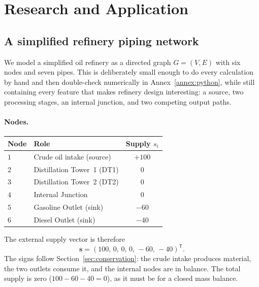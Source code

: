 \documentclass[11pt,a4paper]{article}
\newcommand{\vect}[1]{\mathbf{#1}}
\newcommand{\transpose}{^{\mathsf{T}}}
\begin{document}
\section{Research and Application}
\label{sec:application}

\subsection{A simplified refinery piping network}
\label{sec:refinery-model}

We model a simplified oil refinery as a directed graph $G = (V, E)$
with six nodes and seven pipes. This is deliberately small enough to
do every calculation by hand and then double-check numerically in
Annex~\ref{annex:python}, while still containing every feature that
makes refinery design interesting: a source, two processing stages, an
internal junction, and two competing output paths.

\paragraph{Nodes.}
\begin{center}
\begin{tabular}{@{}llc@{}}
\toprule
Node & Role & Supply $s_i$ \\
\midrule
$1$ & Crude oil intake (source)   & $+100$ \\
$2$ & Distillation Tower~1 (DT1)  & $0$    \\
$3$ & Distillation Tower~2 (DT2)  & $0$    \\
$4$ & Internal Junction           & $0$    \\
$5$ & Gasoline Outlet (sink)      & $-60$  \\
$6$ & Diesel Outlet (sink)        & $-40$  \\
\bottomrule
\end{tabular}
\end{center}
The external supply vector is therefore
\[
  \vect{s} = (100,\, 0,\, 0,\, 0,\, -60,\, -40)\transpose.
\]
The signs follow Section~\ref{sec:conservation}: the crude intake
produces material, the two outlets consume it, and the internal nodes
are in balance. The total supply is zero ($100 - 60 - 40 = 0$), as it
must be for a closed mass balance.
\end{document}
